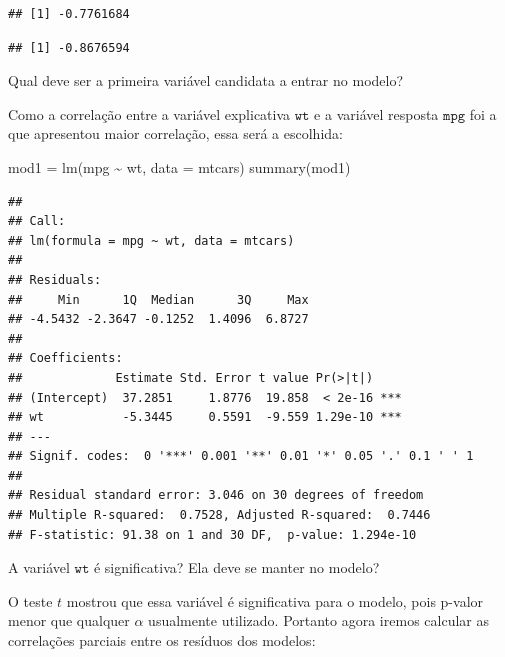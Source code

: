\documentclass[
]{book}
\newenvironment{Shaded}{\begin{snugshade}}{\end{snugshade}}
\newcommand{\AttributeTok}[1]{\textcolor[rgb]{0.77,0.63,0.00}{#1}}
\newcommand{\FunctionTok}[1]{\textcolor[rgb]{0.00,0.00,0.00}{#1}}
\newcommand{\NormalTok}[1]{#1}
\newcommand{\OtherTok}[1]{\textcolor[rgb]{0.56,0.35,0.01}{#1}}
\newcommand{\SpecialCharTok}[1]{\textcolor[rgb]{0.00,0.00,0.00}{#1}}
\begin{document}
\begin{verbatim}
## [1] -0.7761684
\end{verbatim}

\begin{Shaded}
\end{Shaded}

\begin{verbatim}
## [1] -0.8676594
\end{verbatim}

Qual deve ser a primeira variável candidata a entrar no modelo?

Como a correlação entre a variável explicativa \(\texttt{wt}\) e a variável resposta \(\texttt{mpg}\) foi a que apresentou maior correlação, essa será a escolhida:

\begin{Shaded}
\begin{Highlighting}[]
\NormalTok{mod1 }\OtherTok{=} \FunctionTok{lm}\NormalTok{(mpg }\SpecialCharTok{\textasciitilde{}}\NormalTok{ wt, }\AttributeTok{data =}\NormalTok{ mtcars)}
\FunctionTok{summary}\NormalTok{(mod1)}
\end{Highlighting}
\end{Shaded}

\begin{verbatim}
## 
## Call:
## lm(formula = mpg ~ wt, data = mtcars)
## 
## Residuals:
##     Min      1Q  Median      3Q     Max 
## -4.5432 -2.3647 -0.1252  1.4096  6.8727 
## 
## Coefficients:
##             Estimate Std. Error t value Pr(>|t|)    
## (Intercept)  37.2851     1.8776  19.858  < 2e-16 ***
## wt           -5.3445     0.5591  -9.559 1.29e-10 ***
## ---
## Signif. codes:  0 '***' 0.001 '**' 0.01 '*' 0.05 '.' 0.1 ' ' 1
## 
## Residual standard error: 3.046 on 30 degrees of freedom
## Multiple R-squared:  0.7528, Adjusted R-squared:  0.7446 
## F-statistic: 91.38 on 1 and 30 DF,  p-value: 1.294e-10
\end{verbatim}

A variável \(\texttt{wt}\) é significativa? Ela deve se manter no modelo?

O teste \(t\) mostrou que essa variável é significativa para o modelo, pois p-valor menor que qualquer \(\alpha\) usualmente utilizado. Portanto agora iremos calcular as correlações parciais entre os resíduos dos modelos:
\end{document}
